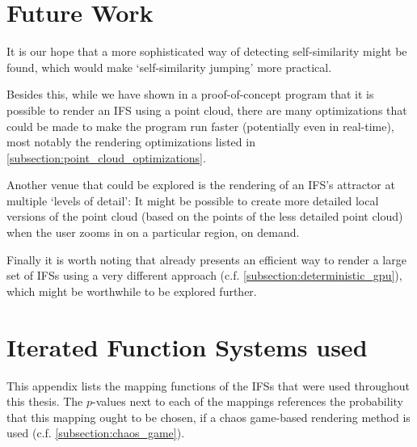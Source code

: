 \documentclass[11pt]{article}
\begin{document}
\section{Future Work}
\label{sec:org6a08dfe}
\label{section:further_work}

It is our hope that a more sophisticated way of detecting self-similarity might be found,
which would make `self-similarity jumping' more practical.

Besides this, while we have shown in a proof-of-concept program that it is possible to render an IFS using a point cloud,
there are many optimizations that could be made to make the program run faster (potentially even in real-time),
most notably the rendering optimizations listed in \autoref{subsection:point_cloud_optimizations}.

Another venue that could be explored is the rendering of an IFS's attractor at multiple `levels of detail':
It might be possible to create more detailed local versions of the point cloud (based on the points of the less detailed point cloud) when the user
zooms in on a particular region, on demand.

Finally it is worth noting that \cite{lawlor2012gpu} already presents an efficient way to render 
a large set of IFSs using a very different approach (c.f. \autoref{subsection:deterministic_gpu}), 
which might be worthwhile to be explored further.

\pagebreak
\printbibliography
\clearpage

\appendix

\section{Iterated Function Systems used}
\label{sec:org7ad83de}

This appendix lists the mapping functions of the IFSs that were used throughout this thesis.
The \(p\)-values next to each of the mappings references the probability that this mapping ought to be chosen,
if a chaos game-based rendering method is used (c.f. \autoref{subsection:chaos_game}).
\end{document}
